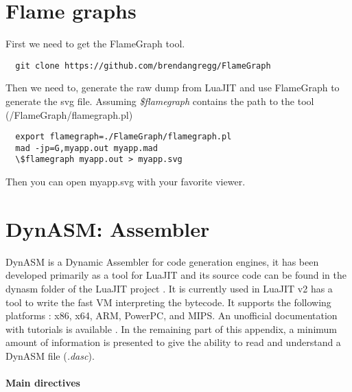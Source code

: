 
\chapter{Flame graphs}
\label{Apendix:fl}

First we need to get the FlameGraph \cite{flamegraph} tool.
\begin{center}
\begin{lstlisting}
  git clone https://github.com/brendangregg/FlameGraph
\end{lstlisting}
\end{center}
Then we need to, generate the raw dump from LuaJIT and use FlameGraph to generate
the svg file. Assuming \emph{\$flamegraph} contains the path to the tool (/FlameGraph/flamegraph.pl)

\begin{center}
\begin{lstlisting}
  export flamegraph=./FlameGraph/flamegraph.pl
  mad -jp=G,myapp.out myapp.mad
  \$flamegraph myapp.out > myapp.svg
\end{lstlisting}
\end{center}
Then you can open myapp.svg with your favorite viewer.


\chapter{DynASM: Assembler}
\label{Apendix:DynASM}

DynASM is a Dynamic Assembler for code generation engines, it has been developed
primarily as a tool for LuaJIT and its source code can be found in the dynasm
folder of the LuaJIT project \cite{luajit-src}. It is currently used in LuaJIT
v2 has a tool to write the fast VM interpreting the bytecode. It supports the
following platforms : x86, x64, ARM, PowerPC, and MIPS. An unofficial
documentation with tutorials is available \cite{dynasm}. In the remaining part
of this appendix, a minimum amount of information is presented to give the
ability to read and understand a DynASM file (\emph{.dasc}).


\subsubsection{Main directives}

